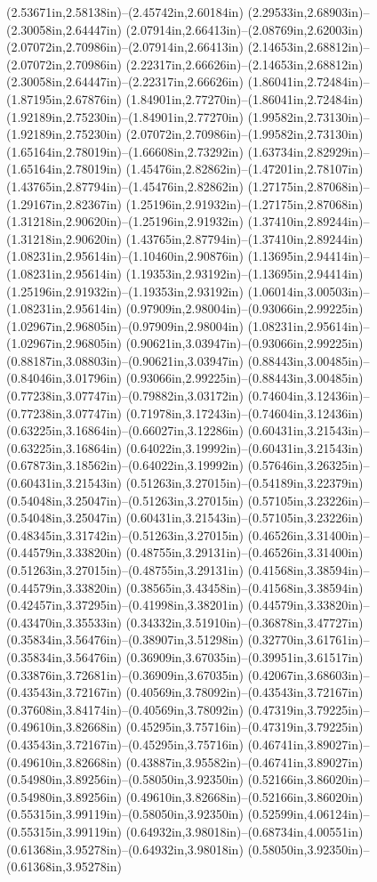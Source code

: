 (2.53671in,2.58138in)--(2.45742in,2.60184in) (2.29533in,2.68903in)--(2.30058in,2.64447in) (2.07914in,2.66413in)--(2.08769in,2.62003in) (2.07072in,2.70986in)--(2.07914in,2.66413in) (2.14653in,2.68812in)--(2.07072in,2.70986in) (2.22317in,2.66626in)--(2.14653in,2.68812in) (2.30058in,2.64447in)--(2.22317in,2.66626in) (1.86041in,2.72484in)--(1.87195in,2.67876in) (1.84901in,2.77270in)--(1.86041in,2.72484in) (1.92189in,2.75230in)--(1.84901in,2.77270in) (1.99582in,2.73130in)--(1.92189in,2.75230in) (2.07072in,2.70986in)--(1.99582in,2.73130in) (1.65164in,2.78019in)--(1.66608in,2.73292in) (1.63734in,2.82929in)--(1.65164in,2.78019in) (1.45476in,2.82862in)--(1.47201in,2.78107in) (1.43765in,2.87794in)--(1.45476in,2.82862in) (1.27175in,2.87068in)--(1.29167in,2.82367in) (1.25196in,2.91932in)--(1.27175in,2.87068in) (1.31218in,2.90620in)--(1.25196in,2.91932in) (1.37410in,2.89244in)--(1.31218in,2.90620in) (1.43765in,2.87794in)--(1.37410in,2.89244in) (1.08231in,2.95614in)--(1.10460in,2.90876in) (1.13695in,2.94414in)--(1.08231in,2.95614in) (1.19353in,2.93192in)--(1.13695in,2.94414in) (1.25196in,2.91932in)--(1.19353in,2.93192in) (1.06014in,3.00503in)--(1.08231in,2.95614in) (0.97909in,2.98004in)--(0.93066in,2.99225in) (1.02967in,2.96805in)--(0.97909in,2.98004in) (1.08231in,2.95614in)--(1.02967in,2.96805in) (0.90621in,3.03947in)--(0.93066in,2.99225in) (0.88187in,3.08803in)--(0.90621in,3.03947in) (0.88443in,3.00485in)--(0.84046in,3.01796in) (0.93066in,2.99225in)--(0.88443in,3.00485in) (0.77238in,3.07747in)--(0.79882in,3.03172in) (0.74604in,3.12436in)--(0.77238in,3.07747in) (0.71978in,3.17243in)--(0.74604in,3.12436in) (0.63225in,3.16864in)--(0.66027in,3.12286in) (0.60431in,3.21543in)--(0.63225in,3.16864in) (0.64022in,3.19992in)--(0.60431in,3.21543in) (0.67873in,3.18562in)--(0.64022in,3.19992in) (0.57646in,3.26325in)--(0.60431in,3.21543in) (0.51263in,3.27015in)--(0.54189in,3.22379in) (0.54048in,3.25047in)--(0.51263in,3.27015in) (0.57105in,3.23226in)--(0.54048in,3.25047in) (0.60431in,3.21543in)--(0.57105in,3.23226in) (0.48345in,3.31742in)--(0.51263in,3.27015in) (0.46526in,3.31400in)--(0.44579in,3.33820in) (0.48755in,3.29131in)--(0.46526in,3.31400in) (0.51263in,3.27015in)--(0.48755in,3.29131in) (0.41568in,3.38594in)--(0.44579in,3.33820in) (0.38565in,3.43458in)--(0.41568in,3.38594in) (0.42457in,3.37295in)--(0.41998in,3.38201in) (0.44579in,3.33820in)--(0.43470in,3.35533in) (0.34332in,3.51910in)--(0.36878in,3.47727in) (0.35834in,3.56476in)--(0.38907in,3.51298in) (0.32770in,3.61761in)--(0.35834in,3.56476in) (0.36909in,3.67035in)--(0.39951in,3.61517in) (0.33876in,3.72681in)--(0.36909in,3.67035in) (0.42067in,3.68603in)--(0.43543in,3.72167in) (0.40569in,3.78092in)--(0.43543in,3.72167in) (0.37608in,3.84174in)--(0.40569in,3.78092in) (0.47319in,3.79225in)--(0.49610in,3.82668in) (0.45295in,3.75716in)--(0.47319in,3.79225in) (0.43543in,3.72167in)--(0.45295in,3.75716in) (0.46741in,3.89027in)--(0.49610in,3.82668in) (0.43887in,3.95582in)--(0.46741in,3.89027in) (0.54980in,3.89256in)--(0.58050in,3.92350in) (0.52166in,3.86020in)--(0.54980in,3.89256in) (0.49610in,3.82668in)--(0.52166in,3.86020in) (0.55315in,3.99119in)--(0.58050in,3.92350in) (0.52599in,4.06124in)--(0.55315in,3.99119in) (0.64932in,3.98018in)--(0.68734in,4.00551in) (0.61368in,3.95278in)--(0.64932in,3.98018in) (0.58050in,3.92350in)--(0.61368in,3.95278in) 